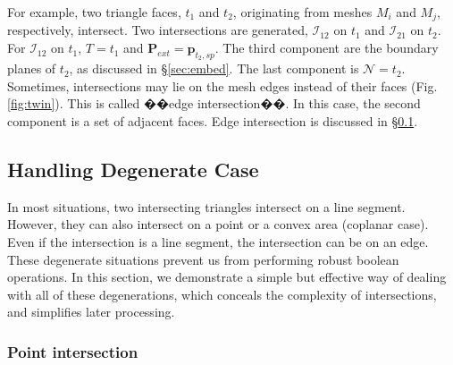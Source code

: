 For example, two triangle faces, $t_1$ and $t_2$, originating from meshes $M_i$ and $M_j$, respectively, intersect. Two intersections are generated, ${\bm{\mathcal{I}}}_{12}$ on $t_1$ and ${\bm{\mathcal{I}}}_{21}$ on $t_2$. For ${\bm{\mathcal{I}}}_{12}$ on $t_1$, $T = t_1$ and $\bm{P}_{ext}=\bm{p}_{t_2, sp}$. The third component are the boundary planes of $t_2$, as discussed in \S\ref{sec:embed}. The last component is $\mathcal{N}=t_2$. Sometimes, intersections may lie on the mesh edges instead of their faces (Fig. \ref{fig:twin}). This is called ��edge intersection��. In this case, the second component is a set of adjacent faces. Edge intersection is discussed in \S\ref{sec:degenerate}.


\subsection{Handling Degenerate Case }
\label{sec:degenerate}


In most situations, two intersecting triangles intersect on a line segment. However, they can also intersect on a point or a convex area (coplanar case). Even if the intersection is a line segment, the intersection can be on an edge. These degenerate situations prevent us from performing robust boolean operations. In this section, we demonstrate a simple but effective way of dealing with all of these degenerations, which conceals the complexity of intersections, and simplifies later processing.



\subsubsection{Point intersection}
\label{sec:ipoint}

